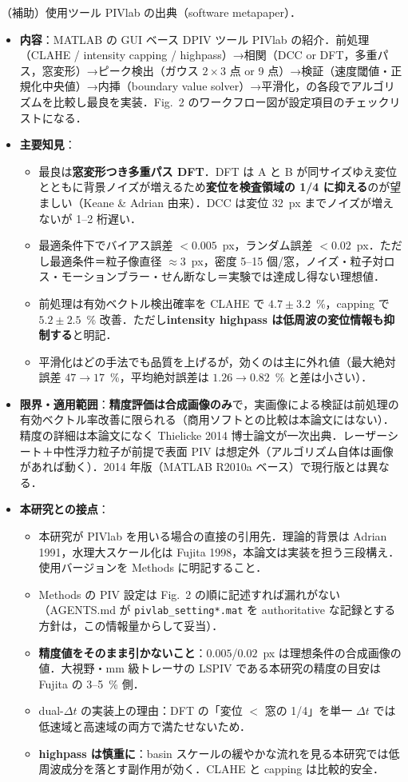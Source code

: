\documentclass[11pt]{jsarticle}
\newcommand{\litref}[1]{{\large\bfseries\color{citecolor}#1}}
\begin{document}
\noindent\litref{Thielicke \& Stamhuis (2014)}\quad（補助）使用ツール PIVlab の出典（software metapaper）．
\begin{itemize}
  \item \textbf{内容}：MATLAB の GUI ベース DPIV ツール PIVlab の紹介．前処理（CLAHE / intensity capping / highpass）→相関（DCC or DFT，多重パス，窓変形）→ピーク検出（ガウス $2 \times 3$ 点 or 9 点）→検証（速度閾値・正規化中央値）→内挿（boundary value solver）→平滑化，の各段でアルゴリズムを比較し最良を実装．Fig.~2 のワークフロー図が設定項目のチェックリストになる．
  \item \textbf{主要知見}：
  \begin{itemize}
    \item 最良は\textbf{窓変形つき多重パス DFT}．DFT は A と B が同サイズゆえ変位とともに背景ノイズが増えるため\textbf{変位を検査領域の 1/4 に抑える}のが望ましい（Keane \& Adrian 由来）．DCC は変位 32~px までノイズが増えないが 1--2 桁遅い．
    \item 最適条件下でバイアス誤差 $< 0.005$~px，ランダム誤差 $< 0.02$~px．ただし最適条件＝粒子像直径 $\approx 3$~px，密度 5--15 個/窓，ノイズ・粒子対ロス・モーションブラー・せん断なし＝実験では達成し得ない理想値．
    \item 前処理は有効ベクトル検出確率を CLAHE で $4.7 \pm 3.2$~\%，capping で $5.2 \pm 2.5$~\% 改善．ただし\textbf{intensity highpass は低周波の変位情報も抑制する}と明記．
    \item 平滑化はどの手法でも品質を上げるが，効くのは主に外れ値（最大絶対誤差 $47 \to 17$~\%，平均絶対誤差は $1.26 \to 0.82$~\% と差は小さい）．
  \end{itemize}
  \item \textbf{限界・適用範囲}：\textbf{精度評価は合成画像のみ}で，実画像による検証は前処理の有効ベクトル率改善に限られる（商用ソフトとの比較は本論文にはない）．精度の詳細は本論文になく Thielicke 2014 博士論文が一次出典．レーザーシート＋中性浮力粒子が前提で表面 PIV は想定外（アルゴリズム自体は画像があれば動く）．2014 年版（MATLAB R2010a ベース）で現行版とは異なる．
  \item \textbf{本研究との接点}：
  \begin{itemize}
    \item 本研究が PIVlab を用いる場合の直接の引用先．理論的背景は Adrian 1991，水理大スケール化は Fujita 1998，本論文は実装を担う三段構え．使用バージョンを Methods に明記すること．
    \item Methods の PIV 設定は Fig.~2 の順に記述すれば漏れがない（AGENTS.md が \texttt{pivlab\_setting*.mat} を authoritative な記録とする方針は，この情報量からして妥当）．
    \item \textbf{精度値をそのまま引かないこと}：$0.005$/$0.02$~px は理想条件の合成画像の値．大視野・mm 級トレーサの LSPIV である本研究の精度の目安は Fujita の 3--5~\% 側．
    \item dual-$\Delta t$ の実装上の理由：DFT の「変位 $<$ 窓の 1/4」を単一 $\Delta t$ では低速域と高速域の両方で満たせないため．
    \item \textbf{highpass は慎重に}：basin スケールの緩やかな流れを見る本研究では低周波成分を落とす副作用が効く．CLAHE と capping は比較的安全．
  \end{itemize}
\end{itemize}
\end{document}
